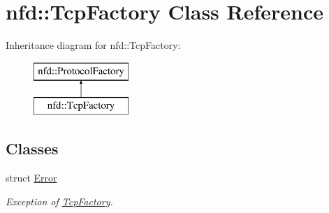 \hypertarget{classnfd_1_1TcpFactory}{}\section{nfd\+:\+:Tcp\+Factory Class Reference}
\label{classnfd_1_1TcpFactory}
Inheritance diagram for nfd\+:\+:Tcp\+Factory\+:\begin{figure}[H]
\begin{center}
\leavevmode
\includegraphics[height=2.000000cm]{classnfd_1_1TcpFactory}
\end{center}
\end{figure}
\subsection*{Classes}
\begin{DoxyCompactItemize}
\item 
struct \hyperlink{structnfd_1_1TcpFactory_1_1Error}{Error}
\begin{DoxyCompactList}\small\item\em Exception of \hyperlink{classnfd_1_1TcpFactory}{Tcp\+Factory}. \end{DoxyCompactList}\end{DoxyCompactItemize}
